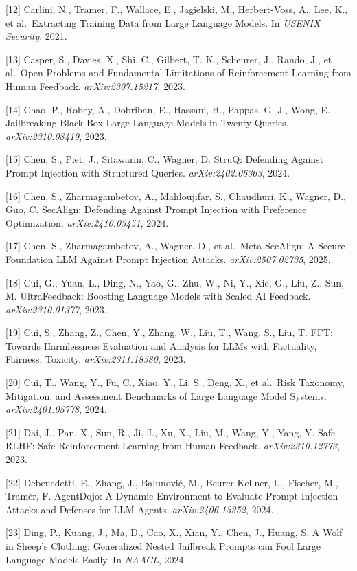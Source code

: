 {[}12{]} Carlini, N., Tramer, F., Wallace, E., Jagielski, M., Herbert-Voss, A., Lee, K., et al.~Extracting Training Data from Large Language Models. In \emph{USENIX Security}, 2021.

{[}13{]} Casper, S., Davies, X., Shi, C., Gilbert, T. K., Scheurer, J., Rando, J., et al.~Open Problems and Fundamental Limitations of Reinforcement Learning from Human Feedback. \emph{arXiv:2307.15217}, 2023.

{[}14{]} Chao, P., Robey, A., Dobriban, E., Hassani, H., Pappas, G. J., Wong, E. Jailbreaking Black Box Large Language Models in Twenty Queries. \emph{arXiv:2310.08419}, 2023.

{[}15{]} Chen, S., Piet, J., Sitawarin, C., Wagner, D. StruQ: Defending Against Prompt Injection with Structured Queries. \emph{arXiv:2402.06363}, 2024.

{[}16{]} Chen, S., Zharmagambetov, A., Mahloujifar, S., Chaudhuri, K., Wagner, D., Guo, C. SecAlign: Defending Against Prompt Injection with Preference Optimization. \emph{arXiv:2410.05451}, 2024.

{[}17{]} Chen, S., Zharmagambetov, A., Wagner, D., et al.~Meta SecAlign: A Secure Foundation LLM Against Prompt Injection Attacks. \emph{arXiv:2507.02735}, 2025.

{[}18{]} Cui, G., Yuan, L., Ding, N., Yao, G., Zhu, W., Ni, Y., Xie, G., Liu, Z., Sun, M. UltraFeedback: Boosting Language Models with Scaled AI Feedback. \emph{arXiv:2310.01377}, 2023.

{[}19{]} Cui, S., Zhang, Z., Chen, Y., Zhang, W., Liu, T., Wang, S., Liu, T. FFT: Towards Harmlessness Evaluation and Analysis for LLMs with Factuality, Fairness, Toxicity. \emph{arXiv:2311.18580}, 2023.

{[}20{]} Cui, T., Wang, Y., Fu, C., Xiao, Y., Li, S., Deng, X., et al.~Risk Taxonomy, Mitigation, and Assessment Benchmarks of Large Language Model Systems. \emph{arXiv:2401.05778}, 2024.

{[}21{]} Dai, J., Pan, X., Sun, R., Ji, J., Xu, X., Liu, M., Wang, Y., Yang, Y. Safe RLHF: Safe Reinforcement Learning from Human Feedback. \emph{arXiv:2310.12773}, 2023.

{[}22{]} Debenedetti, E., Zhang, J., Balunović, M., Beurer-Kellner, L., Fischer, M., Tramèr, F. AgentDojo: A Dynamic Environment to Evaluate Prompt Injection Attacks and Defenses for LLM Agents. \emph{arXiv:2406.13352}, 2024.

{[}23{]} Ding, P., Kuang, J., Ma, D., Cao, X., Xian, Y., Chen, J., Huang, S. A Wolf in Sheep's Clothing: Generalized Nested Jailbreak Prompts can Fool Large Language Models Easily. In \emph{NAACL}, 2024.

